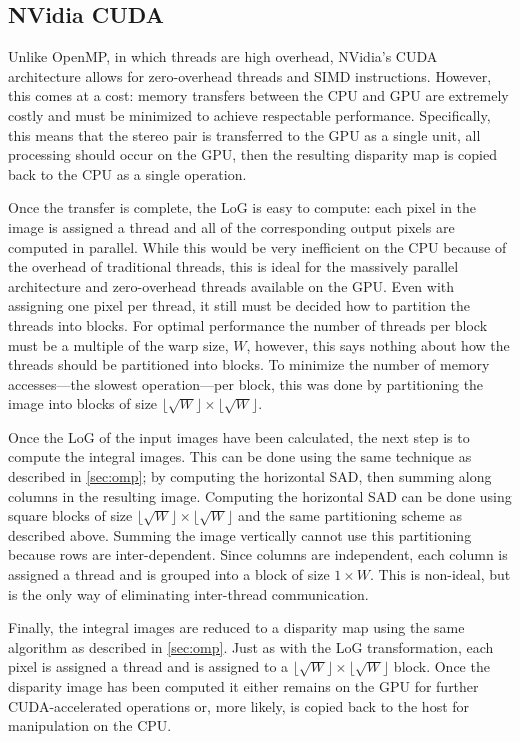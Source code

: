 \documentclass{article}
\let\orgautoref\autoref
\providecommand{\Autoref}
        {\def\equationautorefname{Equation}%
         \def\figureautorefname{Figure}%
         \def\subfigureautorefname{Figure}%
         \def\Itemautorefname{Item}%
         \def\tableautorefname{Table}%
         \def\sectionautorefname{Section}%
         \def\subsectionautorefname{Section}%
         \def\subsubsectionautorefname{Section}%
         \def\chapterautorefname{Section}%
         \def\partautorefname{Part}%
         \orgautoref}
\newcommand{\floor}[1]{\lfloor #1 \rfloor}
\begin{document}
\subsection{NVidia CUDA}
\label{sec:parallel-cuda}
Unlike OpenMP, in which threads are high overhead, NVidia's CUDA architecture
allows for zero-overhead threads and SIMD instructions. However, this comes at
a cost: memory transfers between the CPU and GPU are extremely costly and must
be minimized to achieve respectable performance. Specifically, this means that
the stereo pair is transferred to the GPU as a single unit, all processing
should occur on the GPU, then the resulting disparity map is copied back to the
CPU as a single operation.

Once the transfer is complete, the LoG is easy to compute: each pixel in the
image is assigned a thread and all of the corresponding output pixels are
computed in parallel. While this would be very inefficient on the CPU because
of the overhead of traditional threads, this is ideal for the massively
parallel architecture and zero-overhead threads available on the GPU. Even
with assigning one pixel per thread, it still must be decided how to partition
the threads into blocks. For optimal performance the number of threads per block
must be a multiple of the warp size, $W$, however, this says nothing about how the
threads should be partitioned into blocks. To minimize the number of memory
accesses---the slowest operation---per block, this was done by partitioning the
image into blocks of size $\floor{\sqrt{W}} \times \floor{\sqrt{W}}$.

Once the LoG of the input images have been calculated, the next step is to
compute the integral images. This can be done using the same technique as
described in \Autoref{sec:omp}; by computing the horizontal SAD, then summing
along columns in the resulting image. Computing the horizontal SAD can be done
using square blocks of size $\floor{\sqrt{W}} \times \floor{\sqrt{W}}$ and the
same partitioning scheme as described above. Summing the image vertically
cannot use this partitioning because rows are inter-dependent. Since columns
are independent, each column is assigned a thread and is grouped into a block
of size $1 \times W$. This is non-ideal, but is the only way of eliminating
inter-thread communication.

Finally, the integral images are reduced to a disparity map using the same
algorithm as described in \Autoref{sec:omp}. Just as with the LoG
transformation, each pixel is assigned a thread and is assigned to a
$\floor{\sqrt{W}} \times \floor{\sqrt{W}}$ block. Once the disparity image has
been computed it either remains on the GPU for further CUDA-accelerated
operations or, more likely, is copied back to the host for manipulation on the
CPU.
\end{document}
